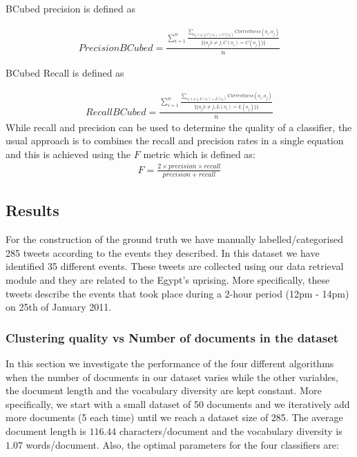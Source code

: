 BCubed precision is defined as 

\begin{eqnarray}
Precision BCubed = \frac{ \sum_{i=1}^{n} \frac{\sum_{o_j:i \neq j, C(o_i)=C(o_j)}^{} Correctness(o_i, o_j)}{\Vert \{ o_j | i \neq j, C(o_i) = C(o_j)  \}  \Vert} }{n}
\end{eqnarray} 

BCubed Recall is defined as

\begin{eqnarray}
Recall BCubed = \frac{ \sum_{i=1}^{n} \frac{\sum_{o_j:i \neq j, L(o_i)=L(o_j)}^{} Correctness(o_i, o_j)}{\Vert \{ o_j | i \neq j, L(o_i) = L(o_j)  \}  \Vert} }{n}
\end{eqnarray} 
While recall and precision can be used to determine the quality of a classifier, the usual approach is to combines the recall and precision rates in a single equation and this is 
achieved using the $F$ metric which is defined as:
\begin{eqnarray}
F = \frac{2 \times precision \times recall}{precision + recall}
\end{eqnarray} 
    
\subsection{Results}
For the construction of the ground truth we have manually labelled/categorised 285 tweets according to the events they described. In this dataset we have identified 35 different events. These tweets are collected using our data retrieval module and they are related to the Egypt's uprising. More specifically, these tweets describe the events that took place during a 2-hour period (12pm - 14pm) on 25th of January 2011.    

\subsubsection{Clustering quality vs Number of documents in the dataset}\label{EvalDiffNoDocs}
In this section we investigate the performance of the four different algorithms when the number of documents in our dataset varies while the other variables, the document length and the vocabulary diversity are kept constant. More specifically, we start with a small dataset of 50 documents and we iteratively add more documents (5 each time) until we reach a dataset size of 285. The average document length is $116.44$ characters/document and the vocabulary diversity is $1.07$ words/document. Also, the optimal parameters for the four classifiers are:


